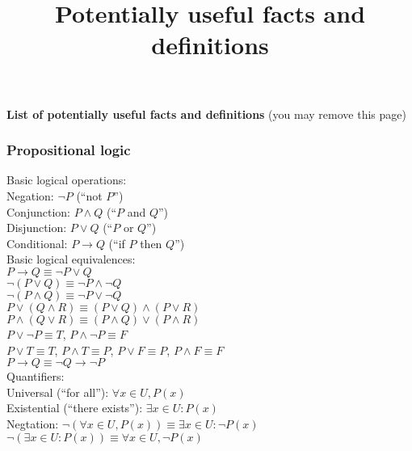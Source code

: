\documentclass[letterpaper,8pt,landscape]{article}
\title{Potentially useful facts and definitions}
\author{}
\begin{document}
\begin{center}
{\bf List of potentially useful facts and definitions} (you may remove this page)
\end{center}
\begin{multicols}{3}
\subsubsection*{Propositional logic}
Basic logical operations:\\
Negation: $\neg P$ (``not $P$'')\\
Conjunction: $P\wedge Q$ (``$P$ and $Q$'')\\
Disjunction: $P\vee Q$ (``$P$ or $Q$'')\\
Conditional: $P\to Q$ (``if $P$ then $Q$'')\\

\noindent Basic logical equivalences:\\
$P\to Q \equiv \neg P\vee Q$\\
$\neg(P\vee Q)\equiv \neg P\wedge\neg Q$\\
$\neg(P\wedge Q)\equiv \neg P\vee\neg Q$\\
$P\vee(Q\wedge R)\equiv (P\vee Q)\wedge (P\vee R)$\\
$P\wedge (Q\vee R)\equiv (P\wedge Q)\vee (P\wedge R)$\\
$P\vee \neg P\equiv T$, $P\wedge \neg P\equiv F$\\
$P\vee T \equiv T$, $P\wedge T \equiv P$, $P\vee F \equiv P$, $P\wedge F\equiv F$\\
$P\to Q \equiv \neg Q\to \neg P$\\

\noindent Quantifiers:\\
Universal (``for all''): $\forall x\in U, P(x)$\\
Existential (``there exists''): $\exists x\in U : P(x)$\\
Negtation: $\neg(\forall x\in U, P(x))\equiv \exists x\in U: \neg P(x)$\\
\phantom{Negation: }  $\neg (\exists x\in U: P(x)) \equiv \forall x\in U, \neg P(x)$


\end{multicols}
\end{document}
